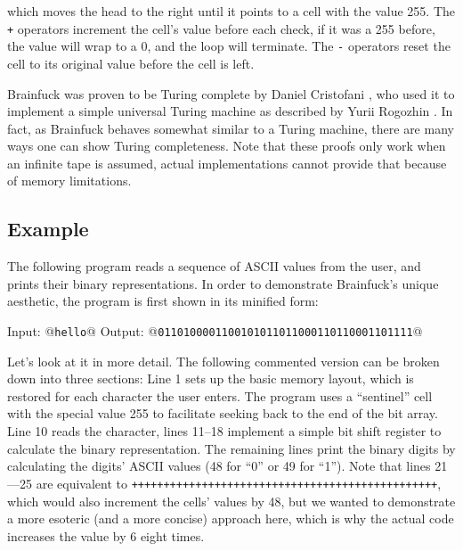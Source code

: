 which moves the head to the right until it points to a cell with the value 255. The \texttt{+} operators increment the cell's value before each check, if it was a 255 before, the value will wrap to a 0, and the loop will terminate. The \texttt{-} operators reset the cell to its original value before the cell is left.

Brainfuck was proven to be Turing complete by Daniel Cristofani \cite{cristofani-universal}, who used it to implement a simple universal Turing machine as described by Yurii Rogozhin \cite{rogozhin1996small}. In fact, as Brainfuck behaves somewhat similar to a Turing machine, there are many ways one can show Turing completeness. Note that these proofs only work when an infinite tape is assumed, actual implementations cannot provide that because of memory limitations.

\subsection{Example}

The following program reads a sequence of ASCII values from the user, and prints their binary representations. In order to demonstrate Brainfuck's unique aesthetic, the program is first shown in its minified form:



\begin{io}
Input: @\texttt{hello}@
Output: @\texttt{0110100001100101011011000110110001101111}@
\end{io}

Let's look at it in more detail. The following commented version can be broken down into three sections: Line 1 sets up the basic memory layout, which is restored for each character the user enters. The program uses a “sentinel” cell with the special value 255 to facilitate seeking back to the end of the bit array. Line 10 reads the character, lines 11--18 implement a simple bit shift register to calculate the binary representation. The remaining lines print the binary digits by calculating the digits' ASCII values (48 for “0” or 49 for “1”). Note that lines 21---25 are equivalent to \texttt{++++++++++++++++++++++++++++++++++++++++++++++++}, which would also increment the cells' values by 48, but we wanted to demonstrate a more esoteric (and a more concise) approach here, which is why the actual code increases the value by 6 eight times.



